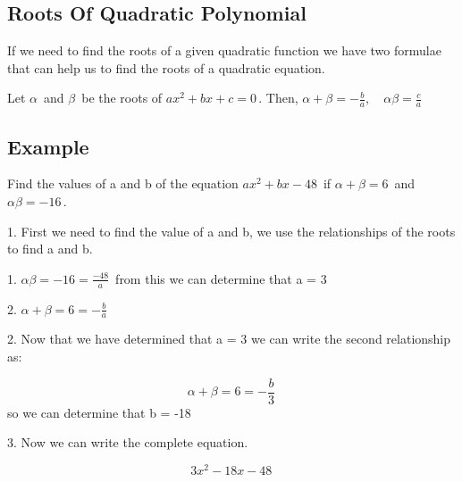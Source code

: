 \subsection{Roots Of Quadratic Polynomial}
\label{sss:root-e652}




If we need to find the roots of a given quadratic function we have two formulae that can
help us to find the roots of a quadratic equation.









Let $\alpha\,$ and $\beta\,$ be the roots of $ax^2+bx+c=0\,$. Then, $\alpha + \beta = -
\frac{b}{a},\quad \alpha\beta = \frac{c}{a}$










\subsection{Example}
\label{sss:exam-1a79}




Find the values of a and b of the equation $ax^2 + bx - 48\,$ if $\alpha + \beta = 6\,$
and $\alpha\beta = -16\,$.



1.  First we need to find the value of a and b, we use the relationships of the roots to
find a and b.

    1.  $\alpha\beta = -16 = \frac{-48}{a}\,$ from this we can determine that a = 3

    2.  $\alpha + \beta = 6 = -\frac{b}{a}\,$

2.  Now that we have determined that a = 3 we can write the second relationship as:

    $$\alpha + \beta = 6 = -\frac{b}{3}\,$$ so we can determine that b = -18

3.  Now we can write the complete equation.

    $$3x^2 -18 x - 48\,$$




